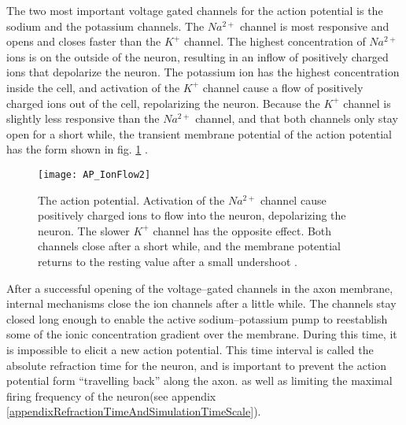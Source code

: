 		The two most important voltage gated channels for the action potential is the sodium and the potassium channels.
		The $Na^{2+}$ channel is most responsive and opens and closes faster than the $K^+$ channel. 
		The highest concentration of $Na^{2+}$ ions is on the outside of the neuron, resulting in an inflow of positively charged ions that depolarize the neuron.
		The potassium ion has the highest concentration inside the cell, and activation of the $K^+$ channel cause a flow of positively charged ions out of the cell, repolarizing the neuron.
		Because the $K^+$ channel is slightly less responsive than the $Na^{2+}$ channel, and that both channels only stay open for a short while, 
			the transient membrane potential of the action potential has the form shown in fig.  \ref{figActionPotential}  %
		\cite{PrinciplesOfNeuralScience4edKAP09}.
	

\begin{figure}[hbt!p]
    \centering
    \texttt{[image: AP\_IonFlow2]}
 	  \caption[The transient axon membrane potential from an action potential]{
				The action potential. Activation of the $Na^{2+}$ channel cause positively charged ions to flow into the neuron, depolarizing the neuron. The slower $K^+$ channel has the opposite effect.
				Both channels close after a short while, and the membrane potential returns to the resting value after a small undershoot \cite{PrinciplesOfNeuralScience4edKAP09}.
				}
    \label{figActionPotential}
\end{figure}



		After a successful opening of the voltage--gated channels in the axon membrane, internal mechanisms close the ion channels after a little while.
		The channels stay closed long enough to enable the active sodium--potassium pump to reestablish some of the ionic concentration gradient over the membrane.
		During this time, it is impossible to elicit a new action potential.
		This time interval is called the absolute refraction time for the neuron,
			and is important to prevent the action potential form ``travelling back'' along the axon\cite{NeuroscienceExploringTheBrain3ed}. %
			as well as limiting the maximal firing frequency of the neuron(see appendix \ref{appendixRefractionTimeAndSimulationTimeScale}). %


